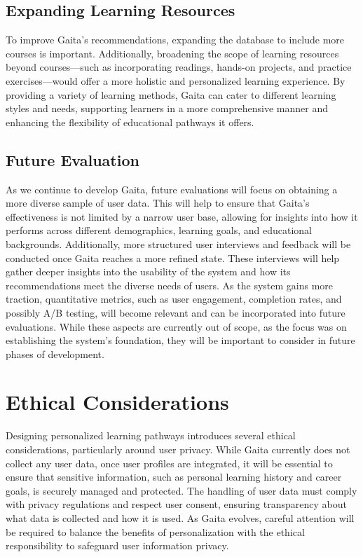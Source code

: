 \subsection{Expanding Learning Resources}

To improve Gaita’s recommendations, expanding the database to include more courses is important. Additionally, broadening the scope of learning resources beyond courses—such as incorporating readings, hands-on projects, and practice exercises—would offer a more holistic and personalized learning experience. By providing a variety of learning methods, Gaita can cater to different learning styles and needs, supporting learners in a more comprehensive manner and enhancing the flexibility of educational pathways it offers.

\subsection{Future Evaluation}

As we continue to develop Gaita, future evaluations will focus on obtaining a more diverse sample of user data. This will help to ensure that Gaita’s effectiveness is not limited by a narrow user base, allowing for insights into how it performs across different demographics, learning goals, and educational backgrounds. Additionally, more structured user interviews and feedback will be conducted once Gaita reaches a more refined state. These interviews will help gather deeper insights into the usability of the system and how its recommendations meet the diverse needs of users. As the system gains more traction, quantitative metrics, such as user engagement, completion rates, and possibly A/B testing, will become relevant and can be incorporated into future evaluations. While these aspects are currently out of scope, as the focus was on establishing the system’s foundation, they will be important to consider in future phases of development.

\section{Ethical Considerations}
Designing personalized learning pathways introduces several ethical considerations, particularly around user privacy. While Gaita currently does not collect any user data, once user profiles are integrated, it will be essential to ensure that sensitive information, such as personal learning history and career goals, is securely managed and protected. The handling of user data must comply with privacy regulations and respect user consent, ensuring transparency about what data is collected and how it is used. As Gaita evolves, careful attention will be required to balance the benefits of personalization with the ethical responsibility to safeguard user information privacy. 